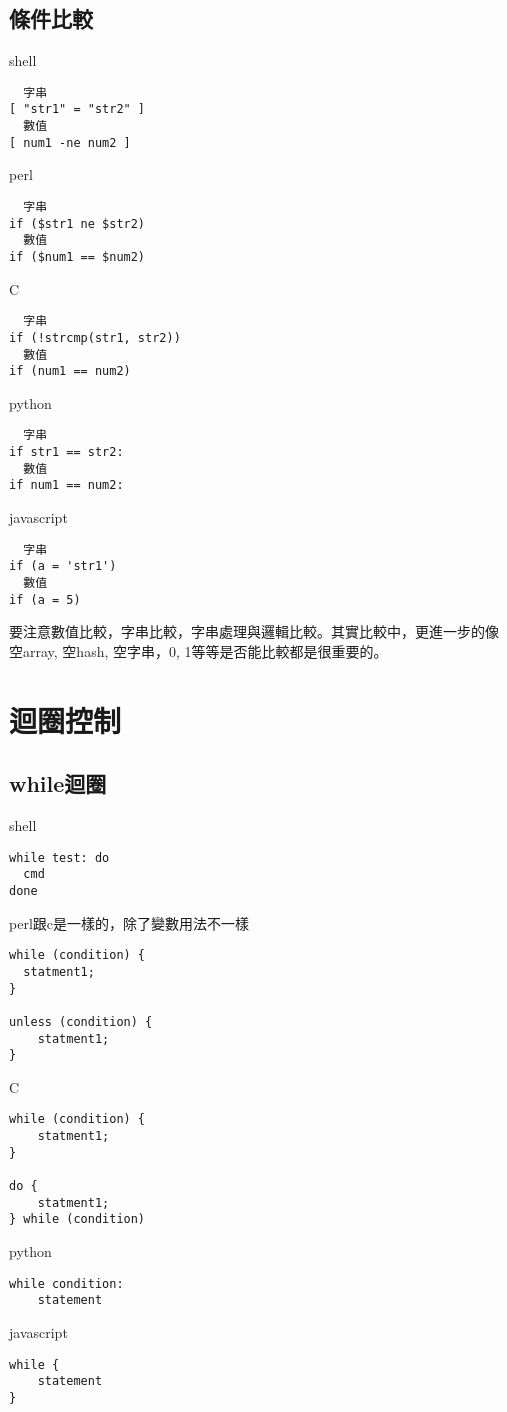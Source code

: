 \subsection{條件比較}
shell
\begin{verbatim}
  字串
[ "str1" = "str2" ]
  數值
[ num1 -ne num2 ]
\end{verbatim}
perl
\begin{verbatim}
  字串
if ($str1 ne $str2)
  數值
if ($num1 == $num2)
  \end{verbatim}
C
  \begin{verbatim}
  字串
if (!strcmp(str1, str2))
  數值
if (num1 == num2)
  \end{verbatim}
python
  \begin{verbatim}
  字串
if str1 == str2:
  數值
if num1 == num2:
  \end{verbatim}
javascript
\begin{verbatim}
  字串
if (a = 'str1')
  數值
if (a = 5)
\end{verbatim}
  要注意數值比較，字串比較，字串處理與邏輯比較。其實比較中，更進一步的像
  空array, 空hash, 空字串，0, 1等等是否能比較都是很重要的。

  \section{迴圈控制}
  \subsection{while迴圈}
  shell
  \begin{verbatim}
while test: do
  cmd
done
  \end{verbatim}

  perl跟c是一樣的，除了變數用法不一樣
  \begin{verbatim}
while (condition) {
  statment1;
}

unless (condition) {
    statment1;
}
\end{verbatim}

C
\begin{verbatim}
while (condition) {
    statment1;
}

do {
    statment1;
} while (condition)
\end{verbatim}
python
\begin{verbatim}
while condition:
    statement
\end{verbatim}
javascript
\begin{verbatim}
while {
    statement
}
\end{verbatim}

